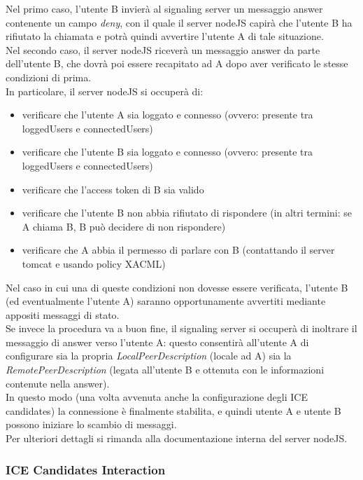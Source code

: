 Nel primo caso, l'utente B invierà al signaling server un messaggio answer contenente un campo \textit{deny}, con il quale il server nodeJS capirà che l'utente B ha rifiutato la chiamata e potrà quindi avvertire l'utente A di tale situazione.\\
Nel secondo caso, il server nodeJS riceverà un messaggio answer da parte dell'utente B, che dovrà poi essere recapitato ad A dopo aver verificato le stesse condizioni di prima.\\
In particolare, il server nodeJS si occuperà di:
\begin{itemize}
\item verificare che l'utente A sia loggato e connesso (ovvero: presente tra loggedUsers e connectedUsers)
\item verificare che l'utente B sia loggato e connesso (ovvero: presente tra loggedUsers e connectedUsers)
\item verificare che l'access token di B sia valido
\item verificare che l'utente B non abbia rifiutato di rispondere (in altri termini: se A chiama B, B può decidere di non rispondere)
\item verificare che A abbia il permesso di parlare con B (contattando il server tomcat e usando policy XACML)
\end{itemize}

Nel caso in cui una di queste condizioni non dovesse essere verificata, l'utente B (ed eventualmente l'utente A) saranno opportunamente avvertiti mediante appositi messaggi di stato.\\
Se invece la procedura va a buon fine, il signaling server si occuperà di inoltrare il messaggio di answer verso l'utente A: questo consentirà all'utente A di configurare sia la propria \textit{LocalPeerDescription} (locale ad A) sia la \textit{RemotePeerDescription} (legata all'utente B e ottenuta con le informazioni contenute nella answer).\\
In questo modo (una volta avvenuta anche la configurazione degli ICE candidates) la connessione è finalmente stabilita, e quindi utente A e utente B possono iniziare lo scambio di messaggi.\\
Per ulteriori dettagli si rimanda alla documentazione interna del server nodeJS.\\

\subsubsection{ICE Candidates Interaction}

